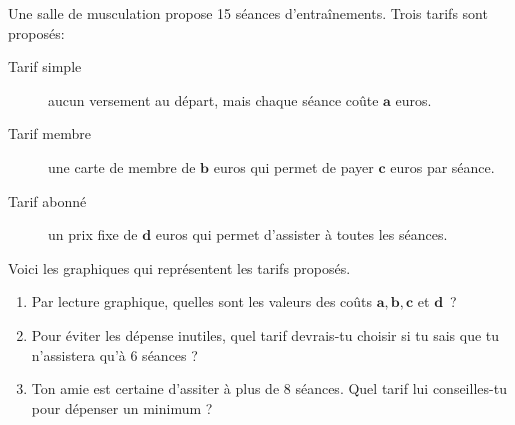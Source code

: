 %
%
    Une salle de musculation propose 15 séances d'entraînements.
    Trois tarifs sont proposés:
    \begin{description}
        \item[Tarif simple] aucun versement au départ, mais chaque séance coûte $\bm{a}$ euros.
        \item[Tarif membre] une carte de membre de $\bm{b}$ euros qui permet de payer $\bm{c}$ euros par séance.
        \item[Tarif abonné] un prix fixe de $\bm{d}$ euros qui permet d'assister à toutes les séances.
    \end{description}
    Voici les graphiques qui représentent les tarifs proposés.
    \begin{center}
        
    \end{center}
    \begin{enumerate}
        \item Par lecture graphique, quelles sont les valeurs des coûts $\bm{a}, \bm{b}, \bm{c}$ et $\bm{d}$~?
        \item Pour éviter les dépense inutiles, quel tarif devrais-tu choisir si tu sais que tu n'assistera qu'à 6 séances ?
        \item Ton amie est certaine d'assiter à plus de 8 séances. Quel tarif lui conseilles-tu pour dépenser un minimum ?
    \end{enumerate}
